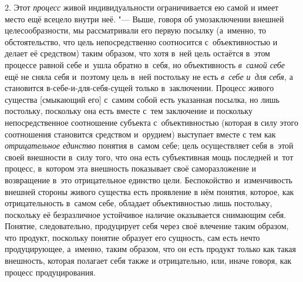 2. Этот {\em процесс} живой индивидуальности ограничивается ею самой и
имеет место ещё всецело внутри неё. "--- Выше, говоря об умозаключении
внешней целесообразности, мы рассматривали его первую посылку (а~именно, то
обстоятельство, что цель непосредственно соотносится с~объективностью и
делает её средством) таким образом, что хотя в~ней цель остаётся в~этом
процессе равной себе и~ушла обратно в~себя, но объективность
{\em в~самой себе} ещё не сняла себя и~поэтому цель в~ней постольку не есть
{\em в~себе и~для себя,}
а становится в-себе-и-для-себя-сущей только в~заключении.
Процесс живого существа [смыкающий его] с~самим собой есть указанная
посылка, но лишь постольку, поскольку она есть вместе с~тем заключение и
поскольку непосредственное соотношение субъекта с~объективностью (которая в
силу этого соотношения становится средством и~орудием) выступает вместе с
тем как {\em отрицательное единство}
понятия в~самом себе; цель осуществляет себя в~этой своей
внешности в~силу того, что она есть субъективная мощь последней и~тот
процесс, в~котором эта внешность показывает своё саморазложение
и возвращение в~это отрицательное единство цели.
Беспокойство и~изменчивость внешней стороны живого существа есть проявление
в нём понятия, которое, как отрицательность в~самом себе, обладает
объективностью лишь постольку, поскольку её безразличное устойчивое наличие
оказывается снимающим себя. Понятие, следовательно, продуцирует себя через
своё влечение таким образом, что продукт, поскольку понятие образует его
сущность, сам есть нечто продуцирующее, а~именно, таким образом, что он
есть продукт только как такая внешность, которая полагает себя также и
отрицательно, или, иначе говоря, как процесс продуцирования.

